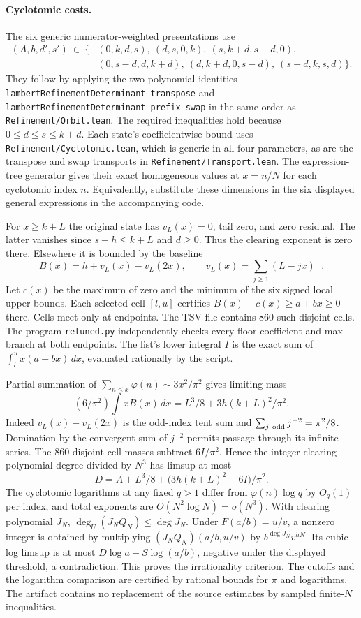 \documentclass[11pt,a4paper]{article}
\begin{document}
\paragraph{Cyclotomic costs.}
The six generic numerator-weighted presentations use
\[
\begin{aligned}
 (A,b,d',s')\ \in\ \bigl\{&
 (0,k,d,s),\ (d,s,0,k),\ (s,k+d,s-d,0),\\
 & (0,s-d,d,k+d),\ (d,k+d,0,s-d),\ (s-d,k,s,d)\bigr\}.
\end{aligned}
\]
They follow by applying the two polynomial identities
\texttt{lambert\allowbreak{}Refinement\allowbreak{}Determinant\_\allowbreak{}transpose} and
\texttt{lambert\allowbreak{}Refinement\allowbreak{}Determinant\_\allowbreak{}prefix\_\allowbreak{}swap} in the same order as
\texttt{Refinement/\allowbreak{}Orbit.lean}. The required inequalities hold because
$0\le d\le s\le k+d$. Each state's coefficientwise bound uses
\texttt{Refinement/\allowbreak{}Cyclotomic.lean}, which is generic in all four
parameters, as are the transpose and swap transports in
\texttt{Refinement/\allowbreak{}Transport.lean}. The expression-tree generator gives
their exact homogeneous values at $x=n/N$ for each cyclotomic index $n$.
Equivalently, substitute these dimensions in the six displayed general
expressions in the accompanying code.

For $x\ge k+L$ the original state has $v_L(x)=0$, tail zero, and zero
residual. The latter vanishes since $s+h\le k+L$ and $d\ge0$. Thus the
clearing exponent is zero there. Elsewhere it is bounded by the baseline
\[
 B(x)=h+v_L(x)-v_L(2x),\qquad v_L(x)=\sum_{j\ge1}(L-jx)_+ .
\]
Let $c(x)$ be the maximum of zero and the minimum of the six signed local
upper bounds. Each selected cell $[l,u]$ certifies
$B(x)-c(x)\ge a+bx\ge0$ there. Cells meet only at endpoints. The TSV file
contains 860 such disjoint cells. The program \texttt{retuned.py}
independently checks every floor coefficient and max branch at both
endpoints. The list's lower integral $I$ is the exact sum of
$\int_l^u x(a+bx)\,dx$, evaluated rationally by the script.

Partial summation of $\sum_{n\le x}\varphi(n)\sim3x^2/\pi^2$ gives limiting
mass
\[
 (6/\pi^2)\int xB(x)\,dx=L^3/8+3h(k+L)^2/\pi^2 .
\]
Indeed $v_L(x)-v_L(2x)$ is the odd-index tent sum and
$\sum_{j\ {\rm odd}}j^{-2}=\pi^2/8$. Domination by the convergent sum of
$j^{-2}$ permits passage through its infinite series. The 860 disjoint
cell masses subtract $6I/\pi^2$. Hence the integer clearing-polynomial
degree divided by $N^3$ has limsup at most
\[
 D=A+L^3/8+\bigl(3h(k+L)^2-6I\bigr)/\pi^2 .
\]
The cyclotomic logarithms at any fixed $q>1$ differ from
$\varphi(n)\log q$ by $O_q(1)$ per index, and total exponents are
$O(N^2\log N)=o(N^3)$. With clearing polynomial $J_N$,
$\deg_U(J_NQ_N)\le\deg J_N$. Under $F(a/b)=u/v$, a nonzero integer is
obtained by multiplying $(J_NQ_N)(a/b,u/v)$ by
$b^{\deg J_N}v^{hN}$. Its cubic log limsup is at most
$D\log a-S\log(a/b)$, negative under the displayed threshold, a
contradiction. This proves the irrationality criterion. The cutoffs and
the logarithm comparison are certified by rational bounds for $\pi$ and
logarithms. The artifact contains no replacement of the source estimates
by sampled finite-$N$ inequalities.
\end{document}
